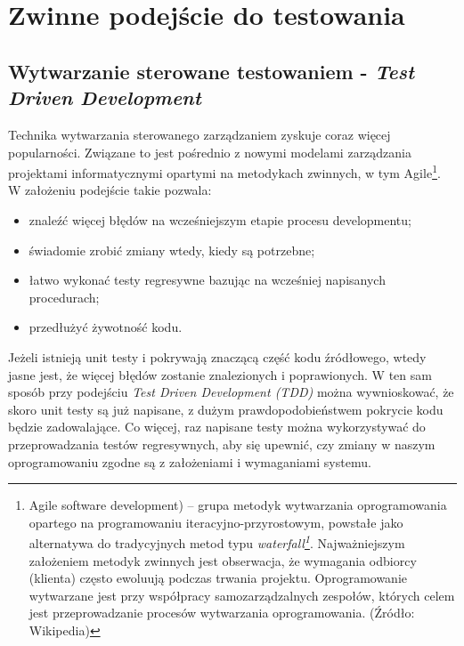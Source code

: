 \section{Zwinne podejście do testowania}
\subsection{Wytwarzanie sterowane testowaniem - \textit{Test Driven Development}}
\label{test_driven_development}
Technika wytwarzania sterowanego zarządzaniem zyskuje coraz więcej popularności. Związane to jest pośrednio z nowymi modelami zarządzania projektami informatycznymi opartymi na metodykach zwinnych, w tym Agile\footnote{Agile software development) – grupa metodyk wytwarzania oprogramowania opartego na programowaniu iteracyjno-przyrostowym, powstałe jako alternatywa do tradycyjnych metod typu \textit{waterfall\footnote{Iteracyjny model kaskadowy (ang. waterfall model) – jeden z kilku rodzajów procesów tworzenia oprogramowania zdefiniowany w inżynierii oprogramowania. Polega on na wykonywaniu podstawowych czynności jako odrębnych faz projektowych, w porządku jeden po drugim. Każda czynność to kolejny schodek (kaskada). Jeśli któraś z faz zwróci niesatysfakcjonujący produkt, należy się cofnąć wykonując kolejne iteracje aż do momentu kiedy otrzymano satysfakcjonujący produkt na końcu schodków. Źródło: Wikipedia}}. Najważniejszym założeniem metodyk zwinnych jest obserwacja, że wymagania odbiorcy (klienta) często ewoluują podczas trwania projektu. Oprogramowanie wytwarzane jest przy współpracy samozarządzalnych zespołów, których celem jest przeprowadzanie procesów wytwarzania oprogramowania. (Źródło: Wikipedia) }. W założeniu podejście takie pozwala:

\begin{itemize}
\item znaleźć więcej błędów na wcześniejszym etapie procesu developmentu;
\item świadomie zrobić zmiany wtedy, kiedy są potrzebne;
\item łatwo wykonać testy regresywne bazując na wcześniej napisanych procedurach;
\item przedłużyć żywotność kodu.
\end{itemize}

Jeżeli istnieją unit testy i pokrywają znaczącą część kodu źródłowego, wtedy jasne jest, że więcej błędów zostanie znalezionych i poprawionych. W ten sam sposób przy podejściu \textit{Test Driven Development (TDD)} można wywnioskować, że skoro unit testy są już napisane, z dużym prawdopodobieństwem pokrycie kodu będzie zadowalające. Co więcej, raz napisane testy można wykorzystywać do przeprowadzania testów regresywnych, aby się upewnić, czy zmiany w naszym oprogramowaniu zgodne są z założeniami i wymaganiami systemu.

